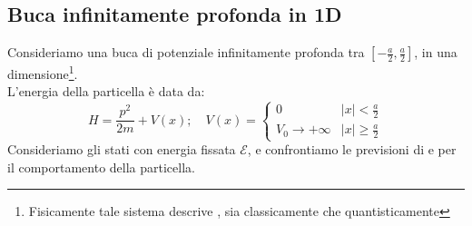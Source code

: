 \documentclass[../../FisicaTeorica.tex]{subfiles}
\begin{document}
\subsection{Buca infinitamente profonda in 1D}
Consideriamo una buca di potenziale infinitamente profonda tra $[-\frac{a}{2},\frac{a}{2}]$, in una dimensione\footnote{Fisicamente tale sistema descrive , sia classicamente che quantisticamente}.\\
L'energia della particella è data da:
\[
H=\frac{p^2}{2m}+V(x); \quad V(x)=\begin{cases}
0 & |x|<\frac{a}{2}\\
V_0\to +\infty & |x|\geq \frac{a}{2}
\end{cases}
\]
Consideriamo gli stati con energia fissata $\mathcal{E}$, e confrontiamo le previsioni di \MC e \MQ per il comportamento della particella.
\end{document}
